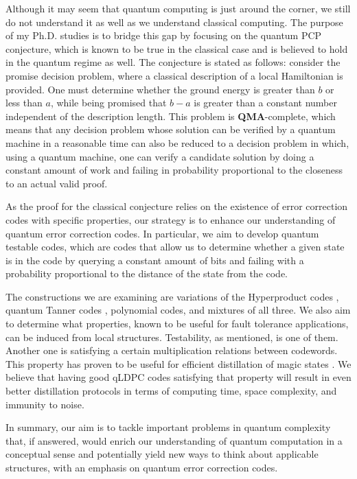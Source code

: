 \documentclass[11pt, oneside]{book}
\begin{document}
Although it may seem that quantum computing is just around the corner, we still do not understand it as well as we understand classical computing. The purpose of my Ph.D. studies is to bridge this gap by focusing on the quantum PCP conjecture, which is known to be true in the classical case \cite{PCPoriginal} and is believed to hold in the quantum regime as well. The conjecture is stated as follows: consider the promise decision problem, where a classical description of a local Hamiltonian is provided. One must determine whether the ground energy is greater than $b$ or less than $a$, while being promised that $b-a$ is greater than a constant number independent of the description length. This problem is \textbf{QMA}-complete, which means that any decision problem whose solution can be verified by a quantum machine in a reasonable time can also be reduced to a decision problem in which, using a quantum machine, one can verify a candidate solution by doing a constant amount of work and failing in probability proportional to the closeness to an actual valid proof.

As the proof for the classical conjecture relies on the existence of error correction codes with specific properties, our strategy is to enhance our understanding of quantum error correction codes. In particular, we aim to develop quantum testable codes, which are codes that allow us to determine whether a given state is in the code by querying a constant amount of bits and failing with a probability proportional to the distance of the state from the code. 

The constructions we are examining are variations of the Hyperproduct codes \cite{Tillich_2014}, quantum Tanner codes \cite{leverrier2022quantum}, polynomial codes, and mixtures of all three. We also aim to determine what properties, known to be useful for fault tolerance applications, can be induced from local structures. Testability, as mentioned, is one of them. Another one is satisfying a certain multiplication relations between codewords. This property has proven to be useful for efficient distillation of magic states \cite{bravyi2012magic}. We believe that having good qLDPC codes satisfying that property will result in even better distillation protocols in terms of computing time, space complexity, and immunity to noise.
 
In summary, our aim is to tackle important problems in quantum complexity that, if answered, would enrich our understanding of quantum computation in a conceptual sense and potentially yield new ways to think about applicable structures, with an emphasis on quantum error correction codes.
\printbibliography[heading=bibliography]
\end{document}

